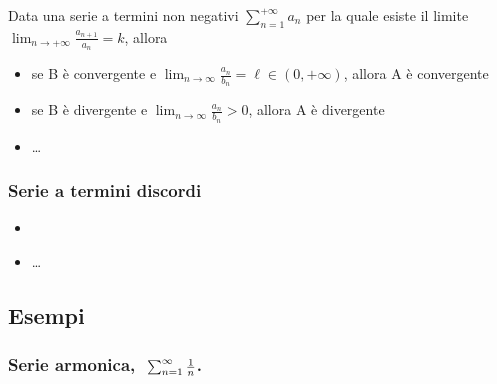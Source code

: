 \documentclass[letterpaper,10pt,italian]{jupyterBook}
\begin{document}
\sphinxAtStartPar
{} Data una serie a termini non negativi \(\sum_{n=1}^{+\infty} a_n\) per la quale esiste il limite \(\lim_{n \rightarrow +\infty} \frac{a_{n+1}}{a_n} = k\), allora
\begin{itemize}
\item {} 
\sphinxAtStartPar
se B è convergente e \(\lim_{n \rightarrow \infty} \frac{a_n}{b_n} = \ell \in (0, +\infty)\), allora A è convergente

\item {} 
\sphinxAtStartPar
se B è  divergente e \(\lim_{n \rightarrow \infty} \frac{a_n}{b_n} > 0\), allora A è  divergente

\end{itemize}

\sphinxAtStartPar
{}

\sphinxAtStartPar
{}
\begin{itemize}
\item {} 
\sphinxAtStartPar
…

\end{itemize}

\sphinxAtStartPar
{}


\subsubsection{Serie a termini discordi}
\label{\detokenize{ch/series:serie-a-termini-discordi}}\begin{itemize}
\item {} 
\sphinxAtStartPar
{}

\item {} 
\sphinxAtStartPar
…

\end{itemize}


\subsection{Esempi}
\label{\detokenize{ch/series:esempi}}\subsubsection*{Serie armonica, \protect\(\ \sum_{n=1}^{\infty} \frac{1}{n}\protect\).}
\end{document}
